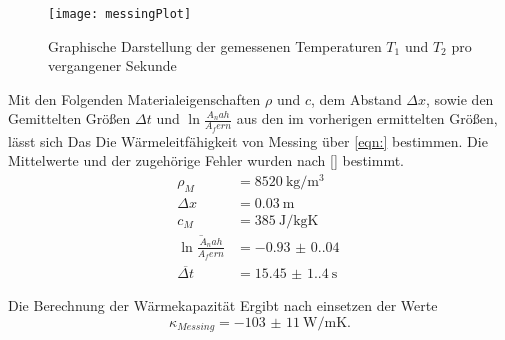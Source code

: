 \begin{figure}[H]
  \label{abb:mp}
  \centering
  \caption{Graphische Darstellung der gemessenen Temperaturen $T_1$ und $T_2$ pro vergangener Sekunde}
  \texttt{[image: messingPlot]}
\end{figure}

\noindent Mit den Folgenden Materialeigenschaften $\rho$ und $c$, dem Abstand $\Delta x$, sowie den 
Gemittelten Größen $\Delta t $ und $ \ln{\frac{A_nah}{A_fern}}$ aus den im vorherigen ermittelten Größen, 
lässt sich Das Die Wärmeleitfähigkeit von Messing über \autoref{eqn:} bestimmen. Die Mittelwerte und 
der zugehörige Fehler wurden nach \autoref{} bestimmt.
\begin{align*}
  \rho_M                                &= \qty{8520}{\kilo\gram\per\cubic\meter}\\
  \Delta x                              &= \qty{0.03}{\meter}\\
  c_M                                   &= \qty{385}{\joule\per\kilo\gram\kelvin}\\
  \overline{\ln{\frac{A_nah}{A_fern}}}  &= \qty{-0.93(0.04)}{}\\
  \overline{\Delta t}                   &= \qty{15.45(1.4)}{\second}
\end{align*}

\noindent Die Berechnung der Wärmekapazität Ergibt nach einsetzen der Werte
\begin{equation}
  \kappa_{Messing} = \qty{-103(11)}{\watt\per\meter\kelvin}.
\end{equation}

